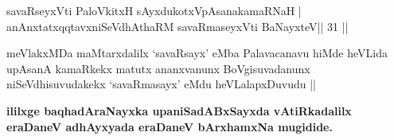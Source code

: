 \begin{shl}
savaRseyxVti PaloVkitxH sAyxdukotxVpAsanakamaRNaH |
anAnxtatxqqtavxniSeVdhAthaRM savaRmaseyxVti BaNayxteV\hfill || 31 ||
\end{shl}

\begin{artha}
meVlakxMDa maMtarxdalilx `savaRsayx' eMba Palavacanavu hiMde heVLida
upAsanA kamaRkekx matutx ananxvanunx BoVgisuvadanunx niSeVdhisuvudakekx
`savaRmasayx' eMdu heVLalapxDuvudu || 
\end{artha}

\begin{center}
{\textbf{ililxge baqhadAraNayxka upaniSadABxSayxda vAtiRkadalilx 
eraDaneV adhAyxyada eraDaneV bArxhamxNa mugidide.}}
\end{center}

